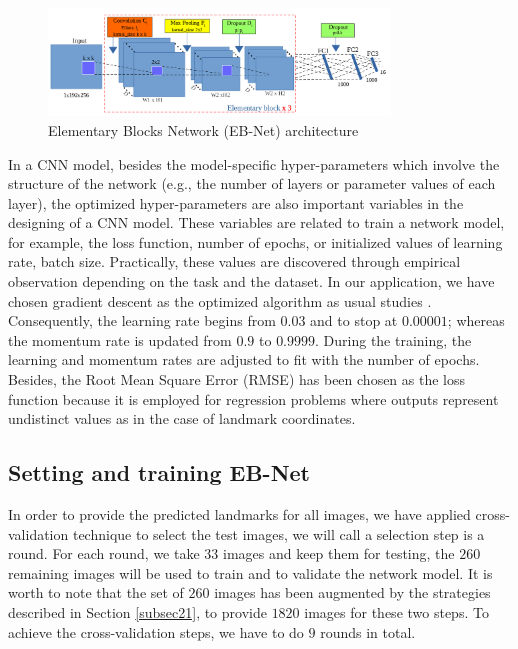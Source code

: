 \documentclass[review]{elsarticle}
\begin{document}
\begin{figure}[h!]
	\centering
	\includegraphics[width=0.81\textwidth]{images/model3}
	\caption{Elementary Blocks Network (EB-Net) architecture}
	\label{figebnet}
\end{figure}

In a CNN model, besides the model-specific hyper-parameters which involve the structure of the network (e.g., the number of layers or parameter values of each layer), the optimized hyper-parameters are also important variables in the designing of a CNN model. These variables are related to train a network model, for example, the loss function, number of epochs, or initialized values of learning rate, batch size. Practically, these values are discovered through empirical observation depending on the task and the dataset. In our application, we have chosen gradient descent as the optimized algorithm as usual studies \cite{krizhevsky2012imagenet, cintas2016automatic}. Consequently, the learning rate begins from $0.03$ and to stop at $0.00001$; whereas the momentum rate is updated from $0.9$ to $0.9999$. During the training, the learning and momentum rates are adjusted to fit with the number of epochs. Besides, the Root Mean Square Error (RMSE) has been chosen as the loss function because it is employed for regression problems where outputs represent undistinct values as in the case of landmark coordinates.

\subsection{Setting and training EB-Net}
\label{subsec23}
In order to provide the predicted landmarks for all images, we have applied cross-validation technique to select the test images, we will call a selection step is a round. For each round, we take $33$ images and keep them for testing, the $260$ remaining images will be used to train and to validate the network model. It is worth to note that the set of $260$ images has been augmented by the strategies described in Section \ref{subsec21}, to provide $1820$ images for these two steps. To achieve the cross-validation steps, we have to do $9$ rounds in total. 
\end{document}
